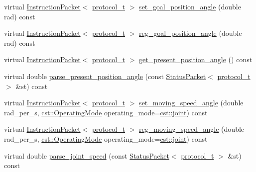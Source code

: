 \begin{DoxyCompactItemize}
virtual \hyperlink{classdynamixel_1_1_instruction_packet}{Instruction\+Packet}$<$ \hyperlink{classdynamixel_1_1servos_1_1_base_servo_ac484c11279ee2576a9a3bb8c940e0baf}{protocol\+\_\+t} $>$ \hyperlink{classdynamixel_1_1servos_1_1_base_servo_ac91b383ed4ba24ccc142fe6cb08479fe}{set\+\_\+goal\+\_\+position\+\_\+angle} (double rad) const 
\item 
virtual \hyperlink{classdynamixel_1_1_instruction_packet}{Instruction\+Packet}$<$ \hyperlink{classdynamixel_1_1servos_1_1_base_servo_ac484c11279ee2576a9a3bb8c940e0baf}{protocol\+\_\+t} $>$ \hyperlink{classdynamixel_1_1servos_1_1_base_servo_a5912ce58f8d174bcccd07ef75fef6a6b}{reg\+\_\+goal\+\_\+position\+\_\+angle} (double rad) const 
\item 
virtual \hyperlink{classdynamixel_1_1_instruction_packet}{Instruction\+Packet}$<$ \hyperlink{classdynamixel_1_1servos_1_1_base_servo_ac484c11279ee2576a9a3bb8c940e0baf}{protocol\+\_\+t} $>$ \hyperlink{classdynamixel_1_1servos_1_1_base_servo_a26a0ccb64fcefde496e1f45ed6462125}{get\+\_\+present\+\_\+position\+\_\+angle} () const 
\item 
virtual double \hyperlink{classdynamixel_1_1servos_1_1_base_servo_a235479ae2b41314f2d5f9492a1b09b44}{parse\+\_\+present\+\_\+position\+\_\+angle} (const \hyperlink{classdynamixel_1_1_status_packet}{Status\+Packet}$<$ \hyperlink{classdynamixel_1_1servos_1_1_base_servo_ac484c11279ee2576a9a3bb8c940e0baf}{protocol\+\_\+t} $>$ \&st) const 
\item 
virtual \hyperlink{classdynamixel_1_1_instruction_packet}{Instruction\+Packet}$<$ \hyperlink{classdynamixel_1_1servos_1_1_base_servo_ac484c11279ee2576a9a3bb8c940e0baf}{protocol\+\_\+t} $>$ \hyperlink{classdynamixel_1_1servos_1_1_base_servo_a5a976fa54ae637537b03596befcb7529}{set\+\_\+moving\+\_\+speed\+\_\+angle} (double rad\+\_\+per\+\_\+s, \hyperlink{namespacedynamixel_1_1servos_1_1cst_ac17b5608f65c6495114d34f8efc4d809}{cst\+::\+Operating\+Mode} operating\+\_\+mode=\hyperlink{namespacedynamixel_1_1servos_1_1cst_ac17b5608f65c6495114d34f8efc4d809a1fdfcfad31f04d24b25c0842e9d99c48}{cst\+::joint}) const 
\item 
virtual \hyperlink{classdynamixel_1_1_instruction_packet}{Instruction\+Packet}$<$ \hyperlink{classdynamixel_1_1servos_1_1_base_servo_ac484c11279ee2576a9a3bb8c940e0baf}{protocol\+\_\+t} $>$ \hyperlink{classdynamixel_1_1servos_1_1_base_servo_a2b9b43a25ff078a54031f58e752a177e}{reg\+\_\+moving\+\_\+speed\+\_\+angle} (double rad\+\_\+per\+\_\+s, \hyperlink{namespacedynamixel_1_1servos_1_1cst_ac17b5608f65c6495114d34f8efc4d809}{cst\+::\+Operating\+Mode} operating\+\_\+mode=\hyperlink{namespacedynamixel_1_1servos_1_1cst_ac17b5608f65c6495114d34f8efc4d809a1fdfcfad31f04d24b25c0842e9d99c48}{cst\+::joint}) const 
\item 
virtual double \hyperlink{classdynamixel_1_1servos_1_1_base_servo_a1fec786a4f11bd3febc4c6122e33cab5}{parse\+\_\+joint\+\_\+speed} (const \hyperlink{classdynamixel_1_1_status_packet}{Status\+Packet}$<$ \hyperlink{classdynamixel_1_1servos_1_1_base_servo_ac484c11279ee2576a9a3bb8c940e0baf}{protocol\+\_\+t} $>$ \&st) const 
\end{DoxyCompactItemize}


